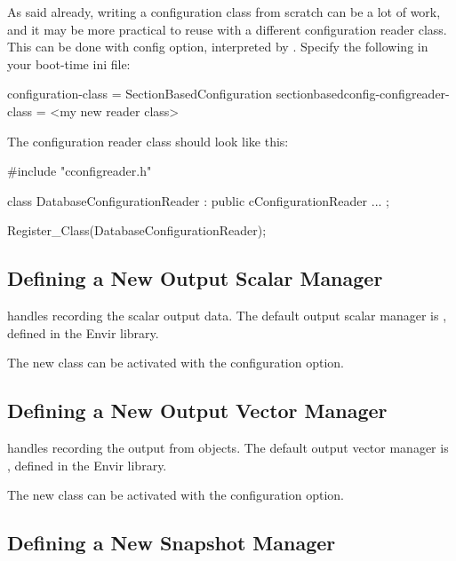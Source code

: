 As said already, writing a configuration class from scratch can
be a lot of work, and it may be more practical to reuse
 with a different configuration
reader class. This can be done with 
config option, interpreted by .
Specify the following in your boot-time ini file:

\begin{inifile}
[General]
configuration-class = SectionBasedConfiguration
sectionbasedconfig-configreader-class = <my new reader class>
\end{inifile}

The configuration reader class should look like this:

\begin{cpp}
#include "cconfigreader.h"

class DatabaseConfigurationReader : public cConfigurationReader
{
   ...
};

Register_Class(DatabaseConfigurationReader);
\end{cpp}


\subsection{Defining a New Output Scalar Manager}
\label{sec:plugin-exts:outputscalarmanager}

 handles recording the scalar output data.
The default output scalar manager is ,
defined in the Envir library.

The new class can be activated with the 
configuration option.


\subsection{Defining a New Output Vector Manager}
\label{sec:plugin-exts:outputvectormanager}

 handles recording the output from  objects.
The default output vector manager is ,
defined in the Envir library.

The new class can be activated with the 
configuration option.


\subsection{Defining a New Snapshot Manager}
\label{sec:plugin-exts:snapshotmanager}

